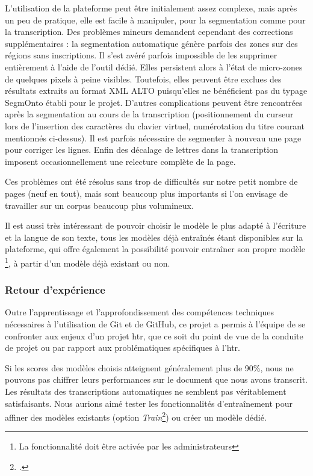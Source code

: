 \documentclass{article}
\begin{document}
L’utilisation de la plateforme peut être initialement assez complexe, mais après un peu de pratique, elle est facile à manipuler, pour la segmentation comme pour la transcription. Des problèmes mineurs demandent cependant des corrections supplémentaires : la segmentation automatique génère parfois des zones sur des régions sans inscriptions. Il s'est avéré parfois impossible de les supprimer entièrement à l'aide de l'outil dédié. Elles persistent alors à l'état de micro-zones de quelques pixels à peine visibles. Toutefois, elles peuvent être exclues des résultats extraits au format XML ALTO puisqu'elles ne bénéficient pas du typage SegmOnto établi pour le projet. D'autres complications peuvent être rencontrées après la segmentation au cours de la  transcription (positionnement du curseur lors de l’insertion des caractères du clavier virtuel, numérotation du titre courant mentionnés ci-dessus). Il est parfois nécessaire de segmenter à nouveau une page pour corriger les lignes. Enfin des décalage de lettres dans la transcription imposent occasionnellement une relecture complète de la page. 

Ces problèmes ont été résolus sans trop de difficultés sur notre petit nombre de pages (neuf en tout), mais sont beaucoup plus importants si l’on envisage de travailler sur un corpus beaucoup plus volumineux.

Il est aussi très intéressant de pouvoir choisir le modèle le plus adapté à l’écriture et la langue de son texte, tous les modèles déjà entraînés étant disponibles sur la plateforme, qui offre également la possibilité pouvoir entraîner son propre modèle \footnote{La fonctionnalité doit être activée par les administrateurs}, à partir d’un modèle déjà existant ou non.

\subsubsection{Retour d'expérience}
Outre l'apprentissage et l'approfondissement des compétences techniques nécessaires à l'utilisation de Git et de GitHub, ce projet a permis à l'équipe de se confronter aux enjeux d'un projet \gls{htr}, que ce soit du point de vue de la conduite de projet ou par rapport aux problématiques spécifiques à l'\gls{htr}.

Si les scores des modèles choisis atteignent généralement plus de 90\%, nous ne pouvons pas chiffrer leurs performances sur le document que nous avons transcrit. Les résultats des transcriptions automatiques ne semblent pas véritablement satisfaisants. Nous aurions aimé tester les fonctionnalités d'entraînement pour affiner des modèles existants (option \textit{Train}\footcite[au sujet de l'entraînement, voir le point 1.7]{chaguePrendreMainEScriptorium}) ou créer un modèle dédié.
\end{document}
